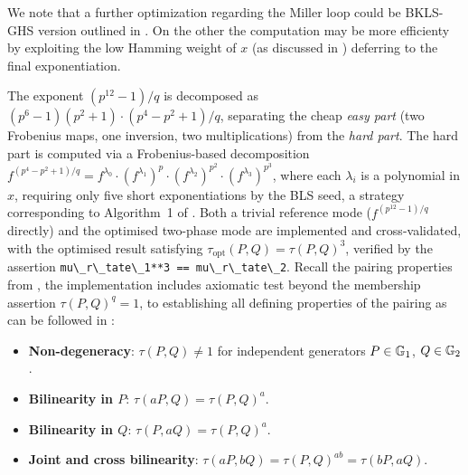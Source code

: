 We note that a further optimization regarding the Miller loop could be BKLS-GHS version outlined in
. On the other the computation may be more efficienty by
exploiting the low Hamming weight of $x$ (as discussed in ) deferring to the final exponentiation.

The exponent $(p^{12}-1)/q$ is decomposed as $(p^6-1)(p^2+1) \cdot (p^4-p^2+1)/q$,
separating the cheap \emph{easy part} (two Frobenius maps, one inversion, two multiplications) from the \emph{hard part}. The hard part is computed via a Frobenius-based decomposition
$f^{(p^4-p^2+1)/q} = f^{\lambda_0} \cdot (f^{\lambda_1})^p \cdot 
(f^{\lambda_2})^{p^2} \cdot (f^{\lambda_3})^{p^3}$, where each $\lambda_i$ is a polynomial in $x$, requiring only five short exponentiations by the BLS seed, a strategy corresponding
to Algorithm~1 of \cite{AranhaBLR2013}. Both a trivial reference mode ($f^{(p^{12}-1)/q}$ directly) and the optimised two-phase mode are implemented and cross-validated, with the optimised result satisfying $\tau_{\mathrm{opt}}(P,Q) =\tau(P,Q)^3$, verified by the assertion \lstinline|mu\_r\_tate\_1**3 == mu\_r\_tate\_2|. Recall the pairing properties from , the implementation includes axiomatic test beyond the membership assertion $\tau(P,Q)^q = 1$,  to establishing all defining properties of the pairing as can be followed in : 
\begin{itemize}
	\item \textbf{Non-degeneracy}: $\tau(P,Q) \neq 1$ for independent generators $P \in \mathbb{G}_1$, $Q \in \mathbb{G}_2$.
	\item \textbf{Bilinearity in $P$}: $\tau(aP, Q) = \tau(P,Q)^a$.
	\item \textbf{Bilinearity in $Q$}: $\tau(P, aQ) = \tau(P,Q)^a$.
	\item \textbf{Joint and cross bilinearity}: $\tau(aP, bQ) = \tau(P,Q)^{ab} = \tau(bP, aQ)$.
\end{itemize}

